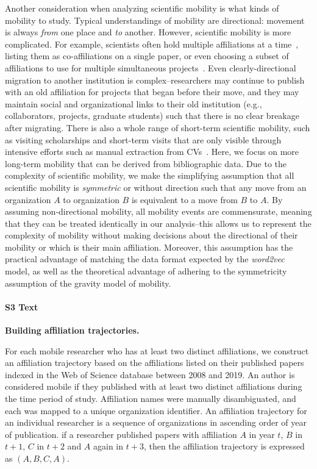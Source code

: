 \documentclass[12pt]{article} %
\begin{document}
Another consideration when analyzing scientific mobility is what kinds of mobility to study.
Typical understandings of mobility are directional: movement is always \textit{from} one place and \textit{to} another.
However, scientific mobility is more complicated.
For example, scientists often hold multiple affiliations at a time~\autocite{markova2016synchronous}, listing them as co-affiliations on a single paper, or even choosing a subset of affiliations to use for multiple simultaneous projects~\autocite{robinson2019mobility}.
Even clearly-directional migration to another institution is complex--researchers may continue to publish with an old affiliation for projects that began before their move, and they may maintain social and organizational links to their old institution (e.g., collaborators, projects, graduate students) such that there is no clear breakage after migrating.
There is also a whole range of short-term scientific mobility, such as visiting scholarships and short-term visits that are only visible through intensive efforts such as manual extraction from CVs~\autocite{woolley2009cv, sandstrom2009cv, canibano2011temporary}.
Here, we focus on more long-term mobility that can be derived from bibliographic data.
Due to the complexity of scientific mobility, we make the simplifying assumption that all scientific mobility is \textit{symmetric} or without direction such that any move from an organization $A$ to organization $B$ is equivalent to a move from $B$ to $A$.
By assuming non-directional mobility, all mobility events are commensurate, meaning that they can be treated identically in our analysis--this allows us to represent the complexity of mobility without making decisions about the directional of their mobility or which is their main affiliation.
Moreover, this assumption has the practical advantage of matching the data format expected by the \textit{word2vec} model, as well as the theoretical advantage of adhering to the symmetricity assumption of the gravity model of mobility.



%
\paragraph*{S3 Text}
\label{si:text:mobility_traj}
{\bf Building affiliation trajectories.}

For each mobile researcher who has at least two distinct affiliations, we construct an affiliation trajectory based on the affiliations listed on their published papers indexed in the Web of Science database between 2008 and 2019.
An author is considered mobile if they published with at least two distinct affiliations during the time period of study.
Affiliation names were manually disambiguated, and each was mapped to a unique organization identifier.
An affiliation trajectory for an individual researcher is a sequence of organizations in ascending order of year of publication.
if a researcher published papers with affiliation $A$ in year $t$, $B$ in $t+1$, $C$ in $t+2$ and $A$ again in $t+3$, then the affiliation trajectory is expressed as $(A, B, C, A)$.
\end{document}

